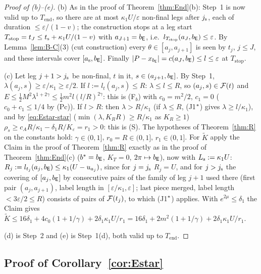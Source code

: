 \begin{proof}[Proof of \textup{(b)}--\textup{(e)}]
(b) As in the proof of Theorem~\ref{thm:End}(b): Step~1 is now valid up to $T_{\mathrm{end}}$, so there are at most
$\kappa_1U/\varepsilon$ non-final legs after $j_{\mathrm s}$, each of duration $\le\varepsilon/(1-v)$; the construction stops at a leg start
$T_{\mathrm{stop}}=t_J\le t_{\mathrm s}+\kappa_1U/(1-v)$ with $a_{J+1}=b_{\mathsf E}$, i.e.\ $l_{T_{\mathrm{stop}}}(a_J,b_{\mathsf E})\le\varepsilon$. By
Lemma~\ref{lem:B-C}(3) (cut construction) every $\theta\in[a_j,a_{j+1}]$ is seen by $t_j$, $j\le J$, and these intervals cover
$[a_{\mathrm s},b_{\mathsf E}]$. Finally $|P-x_{b_{\mathsf E}}|=c(a_J,b_{\mathsf E})\le l\le\varepsilon$ at $T_{\mathrm{stop}}$.

(c) Let leg $j+1>j_{\mathrm s}$ be non-final, $t$ in it, $s\in(a_{j+1},b_{\mathsf E}]$. By Step~1, $\lambda(a_j,s)\ge\varepsilon/\kappa_1\ge\varepsilon/2$.
If $l:=l_t(a_j,s)\le R$: $\lambda\le l\le R$, so $(a_j,s)\in\mathcal F(t)$ and
$E\le\frac12M^2\lambda^{1+2\gamma}\le\frac12m^2l(l/R)^{2\gamma}$: this is \textup{(F$_b$)} with $c_0=m^2/2$, $c_1=0$
($c_0+c_1\le1/4$ by \textup{(Pc)}). If $l>R$: then $\lambda>R/\kappa_1$ (if $\lambda\le R$, (J1$^{*}$) gives $\lambda\ge l/\kappa_1$),
and by \eqref{eq:Estar-star} ($\min(\lambda,K_RR)\ge R/\kappa_1$ as $K_R\ge1$) $\rho_s\ge c_AR/\kappa_1-\delta_1R/K_\varepsilon=r_1>0$:
this is \textup{(S)}. The hypotheses of Theorem~\ref{thm:R} on the constants hold: $\gamma\in(0,1]$, $r_0=R\in(0,1]$,
$r_1\in(0,1]$. For $\tilde K$ apply the Claim in the proof of Theorem~\ref{thm:R} exactly as in the proof of
Theorem~\ref{thm:End}(c) ($b^*=b_{\mathsf E}$, $K_T=0$, $2\pi\mapsto b_{\mathsf E}$), now with $L_{\mathrm s}:=\kappa_1U$: $R_j:=l_{t_j}(a_j,b_{\mathsf E})\le\kappa_1(U-u_{a_j})$,
since for $j=j_{\mathrm s}$ $R_j=U$, and for $j>j_{\mathrm s}$ the covering of $[a_j,b_{\mathsf E}]$ by consecutive pairs of the family of leg $j+1$ used there
(first pair $(a_j,a_{j+1})$, label length in $[\varepsilon/\kappa_1,\varepsilon]$; last piece merged, label length $<3\varepsilon/2\le R$)
consists of pairs of $\mathcal F(t_j)$, to which (J1$^{*}$) applies. With $e^{2\mu}\le\delta_1$ the Claim gives
$\tilde K\le16\delta_1+4c_0(1+1/\gamma)+2\delta_1\kappa_1U/r_1=16\delta_1+2m^2(1+1/\gamma)+2\delta_1\kappa_1U/r_1$.

(d) is Step~2 and (e) is Step~1(d), both valid up to $T_{\mathrm{end}}$.
\end{proof}

\subsection{Proof of Corollary~\ref{cor:Estar}}

